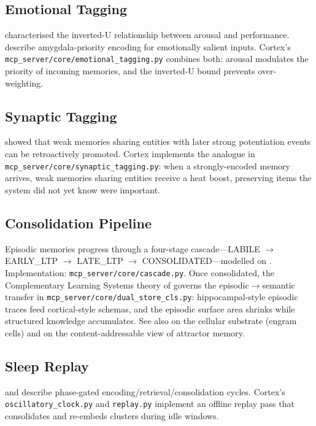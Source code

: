 \documentclass[11pt]{article}
\begin{document}
\subsection{Emotional Tagging}
\label{sec:emotional}

\citet{Yerkes1908} characterised the inverted-U relationship
between arousal and performance.  \citet{Wang2024} describe
amygdala-priority encoding for emotionally salient inputs.
Cortex's \texttt{mcp\_server/core/emotional\_tagging.py} combines
both: arousal modulates the priority of incoming memories, and the
inverted-U bound prevents over-weighting.

\subsection{Synaptic Tagging}
\label{sec:synaptic}

\citet{Frey1997} showed that weak memories sharing entities with
later strong potentiation events can be retroactively promoted.
Cortex implements the analogue in
\texttt{mcp\_server/core/synaptic\_tagging.py}: when a
strongly-encoded memory arrives, weak memories sharing entities
receive a heat boost, preserving items the system did not yet know
were important.

\subsection{Consolidation Pipeline}
\label{sec:consolidation}

Episodic memories progress through a four-stage cascade---LABILE
$\to$ EARLY\_LTP $\to$ LATE\_LTP $\to$ CONSOLIDATED---modelled on
\citet{Kandel2001}.  Implementation:
\texttt{mcp\_server/core/cascade.py}.  Once consolidated, the
Complementary Learning Systems theory of \citet{McClelland1995}
governs the episodic$\to$semantic transfer in
\texttt{mcp\_server/core/dual\_store\_cls.py}: hippocampal-style
episodic traces feed cortical-style schemas, and the episodic
surface area shrinks while structured knowledge accumulates.  See
also \citet{Tonegawa2015} on the cellular substrate (engram cells)
and \citet{Hopfield1982} on the content-addressable view of
attractor memory.

\subsection{Sleep Replay}
\label{sec:sleep}

\citet{Buzsaki2015} and \citet{Hasselmo2005} describe phase-gated
encoding/retrieval/consolidation cycles.  Cortex's
\texttt{oscillatory\_clock.py} and \texttt{replay.py} implement an
offline replay pass that consolidates and re-embeds clusters during
idle windows.
\end{document}
